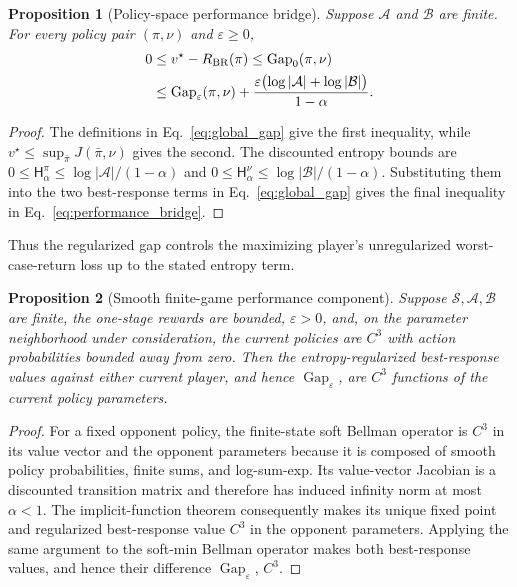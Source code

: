 \documentclass[journal]{IEEEtran}
\newtheorem{proposition}{Proposition}
\theoremstyle{remark}
\begin{document}
	\begin{proposition}[Policy-space performance bridge]\label{prop:performance_bridge}
		Suppose $\mathcal A$ and $\mathcal B$ are finite.
		For every policy pair $(\pi,\nu)$ and $\varepsilon\ge0$,
		\begin{equation}\label{eq:performance_bridge}
			\begin{aligned}
				0&\le v^{\star}-R_{\rm BR}(\pi)
				\le \operatorname{Gap}_{0}(\pi,\nu)\\
				&\le \operatorname{Gap}_{\varepsilon}(\pi,\nu)
				+\frac{\varepsilon\bigl(\log|\mathcal A|+\log|\mathcal B|\bigr)}{1-\alpha}.
			\end{aligned}
		\end{equation}
	\end{proposition}
	\begin{proof}
		The definitions in Eq.~\eqref{eq:global_gap} give the first inequality, while $v^{\star}\le\sup_{\bar\pi}J(\bar\pi,\nu)$ gives the second.
		The discounted entropy bounds are $0\le\mathsf H_\alpha^\pi\le\log|\mathcal A|/(1-\alpha)$ and $0\le\mathsf H_\alpha^\nu\le\log|\mathcal B|/(1-\alpha)$.
		Substituting them into the two best-response terms in Eq.~\eqref{eq:global_gap} gives the final inequality in Eq.~\eqref{eq:performance_bridge}.
	\end{proof}
	
	Thus the regularized gap controls the maximizing player's unregularized worst-case-return loss up to the stated entropy term.
	
	\begin{proposition}[Smooth finite-game performance component]\label{prop:smooth_entropy_gap}
		Suppose $\mathcal S,\mathcal A,\mathcal B$ are finite, the one-stage rewards are bounded, $\varepsilon>0$, and, on the parameter neighborhood under consideration, the current policies are $C^3$ with action probabilities bounded away from zero.
		Then the entropy-regularized best-response values against either current player, and hence $\operatorname{Gap}_\varepsilon$, are $C^3$ functions of the current policy parameters.
	\end{proposition}
	\begin{proof}
		For a fixed opponent policy, the finite-state soft Bellman operator is $C^3$ in its value vector and the opponent parameters because it is composed of smooth policy probabilities, finite sums, and log-sum-exp.
		Its value-vector Jacobian is a discounted transition matrix and therefore has induced infinity norm at most $\alpha<1$.
		The implicit-function theorem consequently makes its unique fixed point and regularized best-response value $C^3$ in the opponent parameters.
		Applying the same argument to the soft-min Bellman operator makes both best-response values, and hence their difference $\operatorname{Gap}_\varepsilon$, $C^3$.
	\end{proof}
	
\end{document}
